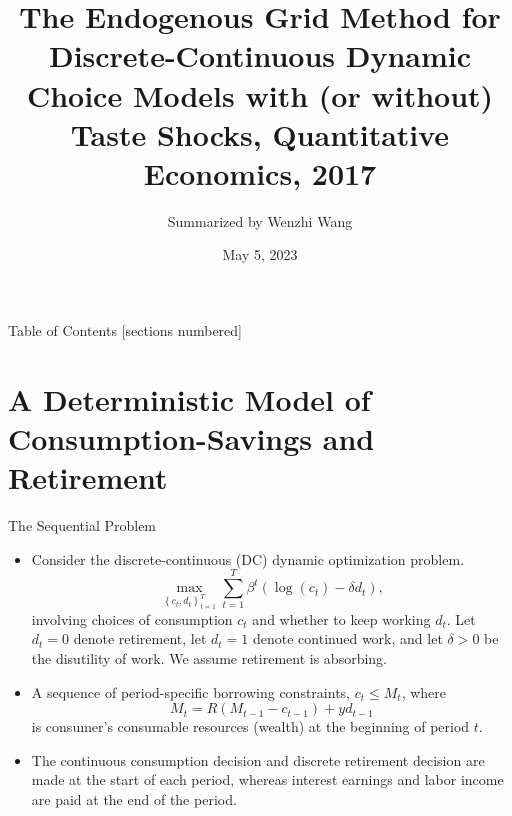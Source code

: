 \documentclass[aspectratio=169]{beamer}
\title{The Endogenous Grid Method for Discrete-Continuous Dynamic Choice Models with (or without) Taste Shocks, Quantitative Economics, 2017}
\author{Summarized by Wenzhi Wang}
\institute{M.Phil. Student at the University of Oxford}
\date{May 5, 2023}
\begin{document}
	
\begin{frame}
	\titlepage
\end{frame}

\begin{frame}{Table of Contents}
	[sections numbered]
	\tableofcontents %
\end{frame}



\section[Deterministic Model]{A Deterministic Model of Consumption-Savings and Retirement}

\begin{frame}{The Sequential Problem}

	\begin{itemize}
		\item Consider the discrete-continuous (DC) dynamic optimization problem.
		\begin{equation} \label{1}
			\max _{\left\{c_t, d_t\right\}_{t=1}^T} \sum_{t=1}^T \beta^t\left(\log \left(c_t\right)-\delta d_t\right),
		\end{equation}
		involving choices of consumption $c_t$ and whether to keep working $d_t$. Let $d_t=0$ denote retirement, let $d_t = 1$ denote continued work, and let $\delta >0$ be the disutility of work. We assume retirement is absorbing.
		\item A sequence of period-specific borrowing constraints, $c_t \leq M_t$, where $$M_t = R(M_{t-1} - c_{t-1}) + yd_{t-1}$$ is consumer's consumable resources (wealth) at the beginning of period $t$. 
		\item The continuous consumption decision and discrete retirement decision are made at the start of each period, whereas interest earnings and labor income are paid at the end of the period.
	\end{itemize}

\end{frame}
\end{document}
